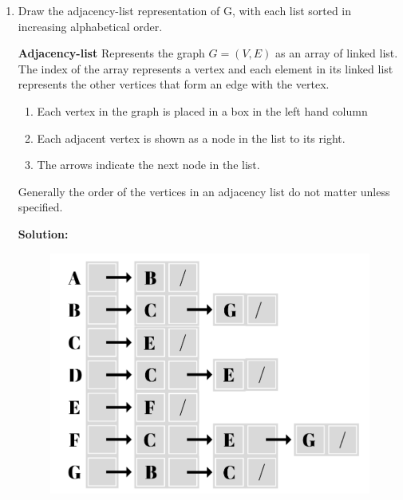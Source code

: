 \documentclass[11pt,fleqn]{book}
\begin{document}
\begin{enumerate}[label=(\alph*)]
    \item Draw the adjacency-list representation of G, with each list sorted in increasing alphabetical order.
    \vspace{1em}
    \begin{definition}
    \textbf{Adjacency-list} Represents the graph $G = (V,E)$ as an array of linked list. The index of the array represents a vertex and each element in its linked list represents the other vertices that form an edge with the vertex.
    \end{definition}
    
    \begin{enumerate}[label=(\arabic*)]
        \item Each vertex in the graph is placed in a box in the left hand column
        \item Each adjacent vertex is shown as a node in the list to its right.
        \item The arrows indicate the next node in the list.
    \end{enumerate}
    \begin{remark}
    Generally the order of the vertices in an adjacency list do not matter unless specified.
    \end{remark}
    \textbf{Solution:}
    \begin{figure}[H]
        \centering
        \includegraphics[width=140mm]{Pictures/al1.png}

\end{figure}
\end{enumerate}
\end{document}
